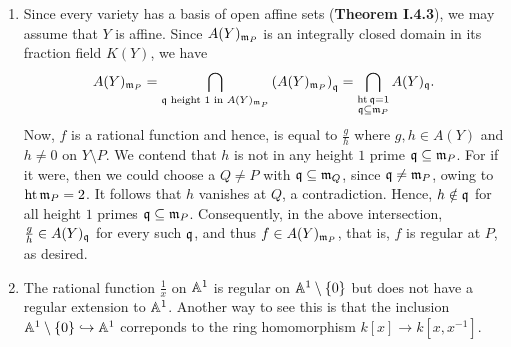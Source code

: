 \setcounter{exercise}{19}
\begin{exercise}
\begin{enumerate}[label=(\alph*)]
    \item Since every variety has a basis of open affine sets (\textbf{Theorem I.4.3}), we may assume that $Y$ is affine. Since $A(Y)_{\mathfrak{m}_P}$ is an integrally closed domain in its fraction field $K(Y)$, we have 
    \begin{equation*}
        A(Y)_{\mathfrak{m}_P} = \bigcap_{\mathfrak{q}\text{ height $1$ in }A(Y)_{\mathfrak{m}_P}} \left(A(Y)_{\mathfrak{m}_P}\right)_{\mathfrak{q}} = \bigcap_{\substack{\operatorname{ht}\mathfrak{q} = 1\\\mathfrak{q}\subseteq\mathfrak{m}_P}} A(Y)_{\mathfrak{q}}.
    \end{equation*}
    Now, $f$ is a rational function and hence, is equal to $\frac gh$ where $g,h\in A(Y)$ and $h\ne 0$ on $Y\setminus P$. We contend that $h$ is not in any height $1$ prime $\mathfrak{q}\subseteq\mathfrak{m}_P$. For if it were, then we could choose a $Q\ne P$ with $\mathfrak{q}\subseteq\mathfrak{m}_Q$, since $\mathfrak{q}\ne\mathfrak{m}_P$, owing to $\operatorname{ht}\mathfrak{m}_P = 2$. It follows that $h$ vanishes at $Q$, a contradiction. Hence, $h\notin\mathfrak{q}$ for all height $1$ primes $\mathfrak{q}\subseteq\mathfrak{m}_P$. Consequently, in the above intersection, $\frac gh\in A(Y)_{\mathfrak{q}}$ for every such $\mathfrak{q}$, and thus $f\in A(Y)_{\mathfrak{m}_P}$, that is, $f$ is regular at $P$, as desired.

    \item The rational function $\frac{1}{x}$ on $\mathbb{A}^1$ is regular on $\mathbb{A}^1\setminus\{0\}$ but does not have a regular extension to $\mathbb{A}^1$. Another way to see this is that the inclusion $\mathbb{A}^1\setminus\{0\}\hookrightarrow\mathbb{A}^1$ correponds to the ring homomorphism $k[x]\to k[x, x^{-1}]$.
\end{enumerate}
\end{exercise}